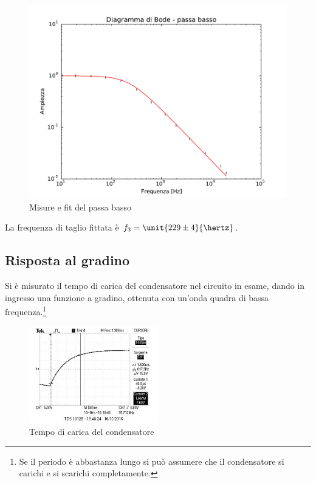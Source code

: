 \documentclass[10pt,a4paper]{article}
\begin{document}
\begin{figure}[h!]
	\centering
\begin{minipage}[h!]{0.49\textwidth}
	\centering
	\resizebox{\textwidth}{!}{
		}
\end{minipage}
\begin{minipage}[h!]{0.49\textwidth}
		\centering
		\includegraphics[width=\textwidth]{../grafici/fit_Bode_Lowpass_800ohm.pdf}
		\caption{Misure e fit del passa basso}
\end{minipage}
\end{figure}

La frequenza di taglio fittata è $f_3 = \unit{229 \pm 4}{\hertz}$.

\subsection{Risposta al gradino}
Si è misurato il tempo di carica del condensatore nel circuito in esame, dando in ingresso una funzione a gradino, ottenuta con un'onda quadra di bassa frequenza.\footnote{Se il periodo è abbastanza lungo si può assumere che il condensatore si carichi e si scarichi completamente.}

\begin{figure}[h!]
	\centering
	\includegraphics[width=0.5\textwidth]{../oscilloscopio/raise_time.jpg}
	\caption{Tempo di carica del condensatore}
	\label{fig:raise}
\end{figure}
\end{document}
